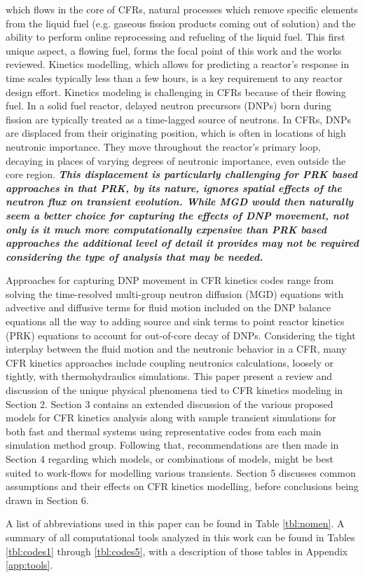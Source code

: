 \documentclass[review]{elsarticle}
\begin{document}
 which flows in the core of CFRs, natural processes which remove specific elements from
 the liquid fuel (e.g. gaseous fission products coming out of solution)
and the ability to perform online reprocessing and refueling of the liquid fuel.
 This first unique aspect, a flowing fuel, forms the focal point of this work and the
 works reviewed. Kinetics modelling, which allows for predicting
a reactor's response in time scales typically less than a few hours, is a key
requirement to any reactor design effort. Kinetics modeling is challenging in CFRs
because of their flowing fuel. In a solid fuel reactor, delayed neutron precursors (DNPs) 
born during fission are typically treated as a time-lagged source of neutrons.
In CFRs, DNPs are displaced from their originating position, which is 
often in locations 
of high neutronic importance. They move throughout the reactor's primary loop,
decaying in places of varying degrees of
neutronic importance, even outside the core region. \textbf{\textit{This
displacement is particularly challenging for PRK based approaches
in that PRK, by its nature, ignores spatial effects of the
neutron flux on transient evolution. While MGD would then naturally
seem a better choice for capturing the effects of DNP movement, not
only is it much more computationally expensive than PRK based approaches
the additional level of detail it provides may not be required considering
the type of analysis that may be needed. }}
\par Approaches for capturing DNP movement in CFR kinetics codes 
range from solving the 
time-resolved multi-group neutron diffusion (MGD) equations with advective and
diffusive terms for fluid motion included on the DNP balance equations
all the way to adding
source and sink terms to point reactor kinetics (PRK) equations to account
for out-of-core decay of DNPs. Considering the tight interplay between the
fluid motion and the neutronic behavior in a CFR, many CFR kinetics approaches
include coupling neutronics calculations, loosely or tightly, 
with thermohydraulics simulations. This paper present a review and discussion of the
unique physical phenomena tied to CFR kinetics modeling in Section 2. Section 3 contains
an extended discussion of the various proposed models for CFR
kinetics analysis along with sample transient simulations for
both fast and thermal systems using representative codes from each main
simulation method group. Following that, recommendations are then made in Section 4 regarding
which models, or combinations of models, might be best suited to 
work-flows for modelling various transients.
 Section 5 discusses common assumptions and their effects on CFR
kinetics modelling, before conclusions being drawn in Section 6.
\par A list of abbreviations used in this paper can be found in Table
\ref{tbl:nomen}. A summary of all computational tools analyzed
in this work can be found in Tables \ref{tbl:codes1} through \ref{tbl:codes5},
 with a description of those tables in Appendix \ref{app:tools}.
\end{document}
